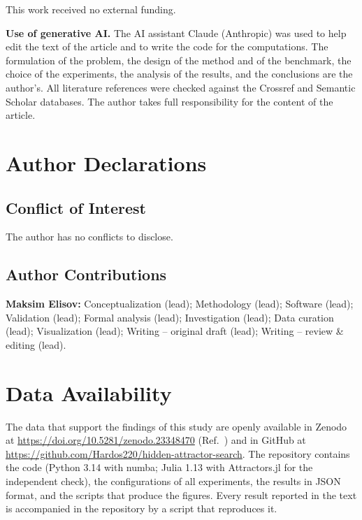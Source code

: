 \begin{acknowledgments}
This work received no external funding.

\textbf{Use of generative AI.} The AI assistant Claude (Anthropic) was used to help edit the text of the article and to write the code for the computations. The formulation of the problem, the design of the method and of the benchmark, the choice of the experiments, the analysis of the results, and the conclusions are the author's. All literature references were checked against the Crossref and Semantic Scholar databases. The author takes full responsibility for the content of the article.
\end{acknowledgments}

\section*{Author Declarations}

\subsection*{Conflict of Interest}
The author has no conflicts to disclose.

\subsection*{Author Contributions}
\textbf{Maksim Elisov:} Conceptualization (lead); Methodology (lead); Software (lead); Validation (lead); Formal analysis (lead); Investigation (lead); Data curation (lead); Visualization (lead); Writing -- original draft (lead); Writing -- review \& editing (lead).

\section*{Data Availability}
The data that support the findings of this study are openly available in Zenodo at \url{https://doi.org/10.5281/zenodo.23348470} (Ref.~) and in GitHub at \url{https://github.com/Hardos220/hidden-attractor-search}. The repository contains the code (Python 3.14 with numba; Julia 1.13 with Attractors.jl for the independent check), the configurations of all experiments, the results in JSON format, and the scripts that produce the figures. Every result reported in the text is accompanied in the repository by a script that reproduces it.
